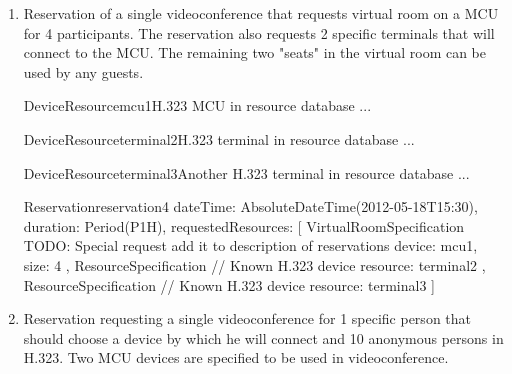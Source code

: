 \begin{enumerate}
\begin{EntityExample}{Reservation}{reservation3}{}
dateTime: AbsoluteDateTime(2012-05-18T15:30), duration: Period(P1H),
requestedPersons: [
  Person { // Martin Srom (must choose a device)
    userIdentity: UserIdentity(srom@cesnet.cz)
  },
  Person { // Petr Holub (must choose a device)
    userIdentity: UserIdentity(hopet@cesnet.cz)
  },
  Person { // Jan Ruzicka (must choose a device)
    name: Jan Ruzicka,
    email: janru@cesnet.cz
  }
]
\end{EntityExample}

\item Reservation of a single videoconference that requests virtual room on a MCU for 4 participants. The reservation also requests 2 specific terminals that will connect to the MCU. The remaining two "seats" in the virtual room can be used by any guests.

\begin{EntityExample}{DeviceResource}{mcu1}{H.323 MCU in resource database}
...
\end{EntityExample}

\begin{EntityExample}{DeviceResource}{terminal2}{H.323 terminal in resource database}
...
\end{EntityExample}

\begin{EntityExample}{DeviceResource}{terminal3}{Another H.323 terminal in resource database}
...
\end{EntityExample}

\begin{EntityExample}{Reservation}{reservation4}{}
dateTime: AbsoluteDateTime(2012-05-18T15:30), duration: Period(P1H),
requestedResources: [
  VirtualRoomSpecification { TODO: Special request add it to description of reservations
    device: mcu1,
    size: 4
  },
  ResourceSpecification { // Known H.323 device
    resource: terminal2
  },
  ResourceSpecification { // Known H.323 device
    resource: terminal3
  }
]
\end{EntityExample}

\item Reservation requesting a single videoconference for 1 specific person that should choose a device by which he will connect and 10 anonymous persons in H.323. Two MCU devices are specified to be used in videoconference.



\end{enumerate}
